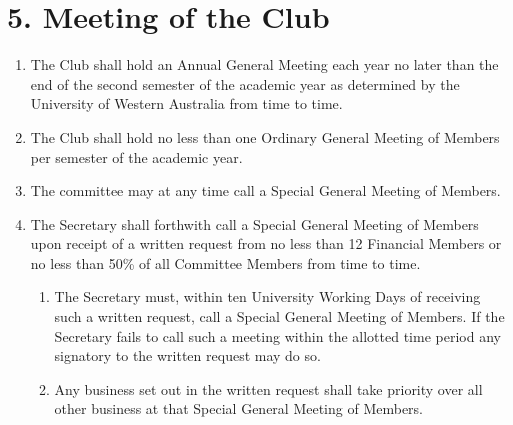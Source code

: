 \documentclass[12pt]{article}
\begin{document}
\section{5. Meeting of the Club}
\begin{enumerate}[label=5.\arabic*]
\item The Club shall hold an Annual General Meeting each year no later than the end of the second semester of the academic year as determined by the University of Western Australia from time to time.
\item The Club shall hold no less than one Ordinary General Meeting of Members per semester of the academic year.
\item The committee may at any time call a Special General Meeting of Members.
\item The Secretary shall forthwith call a Special General Meeting of Members upon receipt of a written request from no less than 12 Financial Members or no less than 50\% of all Committee Members from time to time.
  \begin{enumerate}[label=\theenumi.\arabic*]
     \item The Secretary must, within ten University Working Days of receiving such a written request, call a Special General Meeting of Members. If the Secretary fails to call such a meeting within the allotted time period any signatory to the written request may do so.
     \item Any business set out in the written request shall take priority over all other business at that Special General Meeting of Members.
 \end{enumerate}
\end{enumerate}
\end{document}

